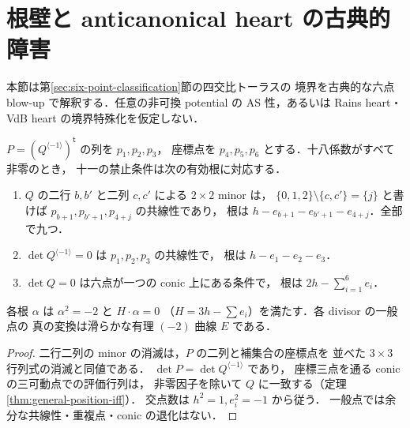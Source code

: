 \section{根壁と anticanonical heart の古典的障害}
\label{sec:root-walls}
本節は第\ref{sec:six-point-classification}節の四交比トーラスの
境界を古典的な六点 blow-up で解釈する．任意の非可換 potential の
AS 性，あるいは Rains heart・VdB heart の境界特殊化を仮定しない．
\begin{proposition}
\label{prop:root-dictionary}
$P=(Q^{\langle-1\rangle})^{\mathsf t}$ の列を $p_1,p_2,p_3$，
座標点を $p_4,p_5,p_6$ とする．十八係数がすべて非零のとき，
十一の禁止条件は次の有効根に対応する．
\begin{enumerate}
\item $Q$ の二行 $b,b'$ と二列 $c,c'$ による $2\times2$ minor は，
$\{0,1,2\}\setminus\{c,c'\}=\{j\}$ と書けば
$p_{b+1},p_{b'+1},p_{4+j}$ の共線性であり，
根は $h-e_{b+1}-e_{b'+1}-e_{4+j}$．全部で九つ．
\item $\det Q^{\langle-1\rangle}=0$ は $p_1,p_2,p_3$ の共線性で，
根は $h-e_1-e_2-e_3$．
\item $\det Q=0$ は六点が一つの conic 上にある条件で，
根は $2h-\sum_{i=1}^6e_i$．
\end{enumerate}
各根 $\alpha$ は $\alpha^2=-2$ と $H\cdot\alpha=0$
（$H=3h-\sum e_i$）を満たす．各 divisor の一般点の
真の変換は滑らかな有理 $(-2)$ 曲線 $E$ である．
\end{proposition}
\begin{proof}
二行二列の minor の消滅は，$P$ の二列と補集合の座標点を
並べた $3\times3$ 行列式の消滅と同値である．
$\det P=\det Q^{\langle-1\rangle}$ であり，
座標三点を通る conic の三可動点での評価行列は，
非零因子を除いて $Q$ に一致する（定理\ref{thm:general-position-iff}）．
交点数は $h^2=1,e_i^2=-1$ から従う．
一般点では余分な共線性・重複点・conic の退化はない．
\end{proof}

